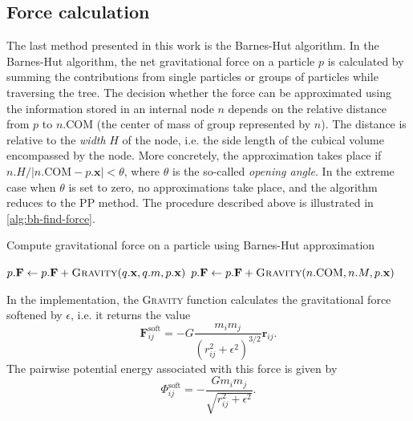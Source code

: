 \subsection{Force calculation}
The last method presented in this work is the Barnes-Hut algorithm.
In the Barnes-Hut algorithm, the net gravitational force on a particle $p$ is calculated by summing the contributions from single particles or groups of particles while traversing the tree.
The decision whether the force can be approximated using the information stored in an internal node $n$ depends on the relative distance from $p$ to $n.\textrm{COM}$ (the center of mass of group represented by $n$).
The distance is relative to the \textit{width} $H$ of the node, i.e. the side length of the cubical volume encompassed by the node.
More concretely, the approximation takes place if $n.H / |n.\mathrm{COM} - p.\mathbf{x}| < \theta$, where $\theta$ is the so-called \textit{opening angle}.
In the extreme case when $\theta$ is set to zero, no approximations take place, and the algorithm reduces to the PP method.
The procedure described above is illustrated in \autoref{alg:bh-find-force}.
\begin{algorithm}
    \caption{Compute gravitational force on a particle using Barnes-Hut approximation}
    \label{alg:bh-find-force}
    \begin{algorithmic}
        \State $p.\mathbf{F} \gets p.\mathbf{F} + \Call{Gravity}{q.\mathbf{x}, q.m, p.\mathbf{x}}$
        \EndIf
        \State \Return
        \EndIf
        \State $p.\mathbf{F} \gets p.\mathbf{F} + \Call{Gravity}{n.\mathrm{COM}, n.M, p.\mathbf{x}}$
        \State \Return
        \EndIf
        \State {}
        \EndFor
        \EndFunction
    \end{algorithmic}
\end{algorithm}
In the implementation, the \textsc{Gravity} function calculates the gravitational force softened by $\epsilon$, i.e. it returns the value
\begin{equation*}
    \mathbf{F}^\textrm{soft}_{ij} = -G\frac{m_i m_j}{(r_{ij}^2 + \epsilon^2)^{3/2}}\mathbf{r}_{ij}.
\end{equation*}
The pairwise potential energy associated with this force is given by
\begin{equation}\label{eq:pe-soft}
    \Phi_{ij}^\textrm{soft} = - \frac{G m_i m_j}{\sqrt{r_{ij}^2 + \epsilon^2}}.
\end{equation}

